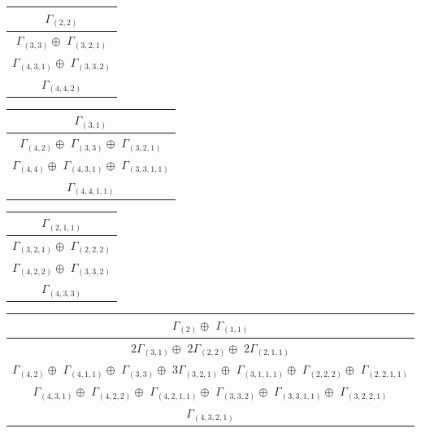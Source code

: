 \documentclass[main.tex]{subfiles}
\begin{document}
\begin{minipage}{.25\textwidth}
\centering
\begin{tabular}{c}
$\Gamma_{(
2 , 
2
)}$
\\ \hline
$\Gamma_{(
3 , 
3
)} \oplus$
$\Gamma_{(
3 , 
2 , 
1
)}$
\\ \hline
$\Gamma_{(
4 , 
3 , 
1
)} \oplus$
$\Gamma_{(
3 , 
3 , 
2
)}$
\\ \hline
$\Gamma_{(
4 , 
4 , 
2
)}$
\\
\end{tabular}\end{minipage}
\bigskip
\begin{minipage}{.25\textwidth}
\centering
\begin{tabular}{c}
$\Gamma_{(
3 , 
1
)}$
\\ \hline
$\Gamma_{(
4 , 
2
)} \oplus$
$\Gamma_{(
3 , 
3
)} \oplus$
$\Gamma_{(
3 , 
2 , 
1
)}$
\\ \hline
$\Gamma_{(
4 , 
4
)} \oplus$
$\Gamma_{(
4 , 
3 , 
1
)} \oplus$
$\Gamma_{(
3 , 
3 , 
1 , 
1
)}$
\\ \hline
$\Gamma_{(
4 , 
4 , 
1 , 
1
)}$
\\
\end{tabular}\end{minipage}
\begin{minipage}{.22\textwidth}
\centering
\begin{tabular}{c}
$\Gamma_{(
2 , 
1 , 
1
)}$
\\ \hline
$\Gamma_{(
3 , 
2 , 
1
)} \oplus$
$\Gamma_{(
2 , 
2 , 
2
)}$
\\ \hline
$\Gamma_{(
4 , 
2 , 
2
)} \oplus$
$\Gamma_{(
3 , 
3 , 
2
)}$
\\ \hline
$\Gamma_{(
4 , 
3 , 
3
)}$
\\
\end{tabular}\end{minipage}
\begin{minipage}{.6\textwidth}
\centering
\begin{tabular}{c}
$\Gamma_{(
2
)} \oplus$
$\Gamma_{(
1 , 
1
)}$
\\ \hline
$2\Gamma_{(
3 , 
1
)} \oplus$
$2\Gamma_{(
2 , 
2
)} \oplus$
$2\Gamma_{(
2 , 
1 , 
1
)} $
\\ \hline
$\Gamma_{(
4 , 
2
)} \oplus$
$\Gamma_{(
4 , 
1 , 
1
)} \oplus$
$\Gamma_{(
3 , 
3
)} \oplus$
$3\Gamma_{(
3 , 
2 , 
1
)} \oplus$
$\Gamma_{(
3 , 
1 , 
1 , 
1
)} \oplus$
$\Gamma_{(
2 , 
2 , 
2
)} \oplus$
$\Gamma_{(
2 , 
2 , 
1 , 
1
)}$
\\ \hline
$\Gamma_{(
4 , 
3 , 
1
)} \oplus$
$\Gamma_{(
4 , 
2 , 
2
)} \oplus$
$\Gamma_{(
4 , 
2 , 
1 , 
1
)} \oplus$
$\Gamma_{(
3 , 
3 , 
2
)} \oplus$
$\Gamma_{(
3 , 
3 , 
1 , 
1
)} \oplus$
$\Gamma_{(
3 , 
2 , 
2 , 
1
)}$
\\ \hline
$\Gamma_{(
4 , 
3 , 
2 , 
1
)}$
\\
\end{tabular}\end{minipage}
\end{document}

